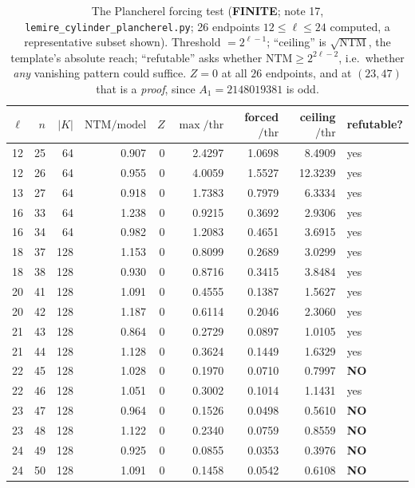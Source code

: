 \documentclass[10pt]{article}
\theoremstyle{plain}
\theoremstyle{definition}
\newcommand{\finite}{\textcolor{finite}{\textsf{\textbf{\footnotesize FINITE}}}}
\begin{document}
\begin{table}[t]
\centering\small
\begin{tabular}{rrrrrrrrl}
\hline
$\ell$ & $n$ & $|K|$ & $\mathrm{NTM}/\mathrm{model}$ & $Z$ & $\max/\mathrm{thr}$
 & forced$/\mathrm{thr}$ & ceiling$/\mathrm{thr}$ & refutable?\\
\hline
12 & 25 & 64 & 0.907 & 0 & 2.4297 & 1.0698 & 8.4909 & yes\\
12 & 26 & 64 & 0.955 & 0 & 4.0059 & 1.5527 & 12.3239 & yes\\
13 & 27 & 64 & 0.918 & 0 & 1.7383 & 0.7979 & 6.3334 & yes\\
16 & 33 & 64 & 1.238 & 0 & 0.9215 & 0.3692 & 2.9306 & yes\\
16 & 34 & 64 & 0.982 & 0 & 1.2083 & 0.4651 & 3.6915 & yes\\
18 & 37 & 128 & 1.153 & 0 & 0.8099 & 0.2689 & 3.0299 & yes\\
18 & 38 & 128 & 0.930 & 0 & 0.8716 & 0.3415 & 3.8484 & yes\\
20 & 41 & 128 & 1.091 & 0 & 0.4555 & 0.1387 & 1.5627 & yes\\
20 & 42 & 128 & 1.187 & 0 & 0.6114 & 0.2046 & 2.3060 & yes\\
21 & 43 & 128 & 0.864 & 0 & 0.2729 & 0.0897 & 1.0105 & yes\\
21 & 44 & 128 & 1.128 & 0 & 0.3624 & 0.1449 & 1.6329 & yes\\
22 & 45 & 128 & 1.028 & 0 & 0.1970 & 0.0710 & 0.7997 & \textbf{NO}\\
22 & 46 & 128 & 1.051 & 0 & 0.3002 & 0.1014 & 1.1431 & yes\\
23 & 47 & 128 & 0.964 & 0 & 0.1526 & 0.0498 & 0.5610 & \textbf{NO}\\
23 & 48 & 128 & 1.122 & 0 & 0.2340 & 0.0759 & 0.8559 & \textbf{NO}\\
24 & 49 & 128 & 0.925 & 0 & 0.0855 & 0.0353 & 0.3976 & \textbf{NO}\\
24 & 50 & 128 & 1.091 & 0 & 0.1458 & 0.0542 & 0.6108 & \textbf{NO}\\
\hline
\end{tabular}
\caption{The Plancherel forcing test (\finite; note 17,
\texttt{lemire\_cylinder\_plancherel.py}; 26 endpoints
$12\le\ell\le24$ computed, a representative subset shown). Threshold
$=2^{\ell-1}$; ``ceiling'' is $\sqrt{\mathrm{NTM}}$, the template's absolute
reach; ``refutable'' asks whether $\mathrm{NTM}\ge2^{2\ell-2}$, i.e.\ whether
\emph{any} vanishing pattern could suffice. $Z=0$ at all $26$ endpoints, and at
$(23,47)$ that is a \emph{proof}, since $A_1=2148019381$ is odd.}
\label{tab:plancherel}
\end{table}
\end{document}
